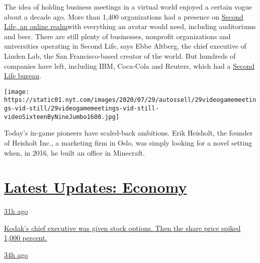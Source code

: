 The idea of holding business meetings in a virtual world enjoyed a
certain vogue about a decade ago. More than 1,400 organizations had a
presence on
\href{https://www.nytimes.com/2006/10/19/technology/19virtual.html}{Second
Life, an online realm}with everything an avatar would need, including
auditoriums and beer. There are still plenty of businesses, nonprofit
organizations and universities operating in Second Life, says Ebbe
Altberg, the chief executive of Linden Lab, the San Francisco-based
creator of the world. But hundreds of companies have left, including
IBM, Coca-Cola and Reuters, which had a
\href{https://www.nytimes.com/2006/10/16/technology/16reuters.html}{Second
Life bureau}.

\texttt{[image: https://static01.nyt.com/images/2020/07/29/autossell/29videogamemeetings-vid-still/29videogamemeetings-vid-still-videoSixteenByNineJumbo1600.jpg]}

Today's in-game pioneers have scaled-back ambitions. Erik Heisholt, the
founder of Heisholt Inc., a marketing firm in Oslo, was simply looking
for a novel setting when, in 2016, he built an office in Minecraft.

\hypertarget{latest-updates-economy}{%
\section{\texorpdfstring{\href{https://www.nytimes.com/live/2020/07/31/business/stock-market-today-coronavirus?action=click\&pgtype=Article\&state=default\&region=MAIN_CONTENT_1\&context=storylines_live_updates}{Latest
Updates:
Economy}}{Latest Updates: Economy}}\label{latest-updates-economy}}

\href{https://www.nytimes.com/live/2020/07/31/business/stock-market-today-coronavirus?action=click\&pgtype=Article\&state=default\&region=MAIN_CONTENT_1\&context=storylines_live_updates\#kodaks-chief-executive-was-given-stock-options-then-the-share-price-spiked-1000-percent}{31h
ago}

\href{https://www.nytimes.com/live/2020/07/31/business/stock-market-today-coronavirus?action=click\&pgtype=Article\&state=default\&region=MAIN_CONTENT_1\&context=storylines_live_updates\#kodaks-chief-executive-was-given-stock-options-then-the-share-price-spiked-1000-percent}{Kodak's
chief executive was given stock options. Then the share price spiked
1,000 percent.}

\href{https://www.nytimes.com/live/2020/07/31/business/stock-market-today-coronavirus?action=click\&pgtype=Article\&state=default\&region=MAIN_CONTENT_1\&context=storylines_live_updates\#fitch-ratings-downgrades-its-outlook-on-us-debt}{34h
ago}

